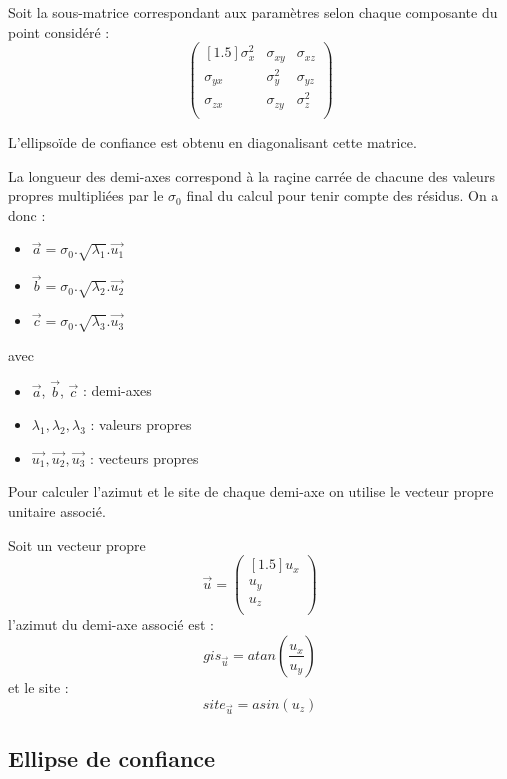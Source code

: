 \documentclass[french]{report}
\begin{document}
Soit la sous-matrice correspondant aux paramètres selon chaque composante du point considéré :
$$\begin{pmatrix}[1.5] \sigma_x^2 & \sigma_{xy} & \sigma_{xz} \\ \sigma_{yx} & \sigma_y^2 & \sigma_{yz} \\  \sigma_{zx} & \sigma_{zy} & \sigma_z^2 \\ \end{pmatrix}$$

L'ellipsoïde de confiance est obtenu en diagonalisant cette matrice.

La longueur des demi-axes correspond à la raçine carrée de chacune des valeurs propres multipliées par le $\sigma_0$ final du calcul pour tenir compte des résidus. On a donc :
\begin{itemize}
\item $\overrightarrow{a}=\sigma_0.\sqrt{\lambda_1}.\overrightarrow{u_1}$
\item $\overrightarrow{b}=\sigma_0.\sqrt{\lambda_2}.\overrightarrow{u_2}$
\item $\overrightarrow{c}=\sigma_0.\sqrt{\lambda_3}.\overrightarrow{u_3}$
\end{itemize}
avec
\begin{itemize}
\item $\overrightarrow{a}$, $\overrightarrow{b}$, $\overrightarrow{c}$ : demi-axes
\item $\lambda_1, \lambda_2, \lambda_3$ : valeurs propres
\item $\overrightarrow{u_1}, \overrightarrow{u_2}, \overrightarrow{u_3}$ : vecteurs propres
\end{itemize}

Pour calculer l'azimut et le site de chaque demi-axe on utilise le vecteur propre unitaire associé.

Soit un vecteur propre $$\overrightarrow{u}=\begin{pmatrix}[1.5] u_x \\ u_y \\ u_z \\ \end{pmatrix}$$ l'azimut du demi-axe associé est : $$gis_{\overrightarrow{u}}=atan(\frac{u_x}{u_y})$$ et le site : $$site_{\overrightarrow{u}}=asin(u_z)$$

\subsection{Ellipse de confiance}
\end{document}
